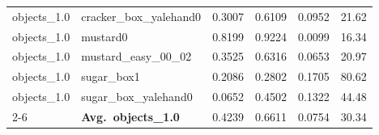 \begin{longtable}{llrrrr}
  objects_1.0 & cracker\_box\_yalehand0 & 0.3007 & 0.6109 & 0.0952 & 21.62 \\
  objects_1.0 & mustard0 & 0.8199 & 0.9224 & 0.0099 & 16.34 \\
  objects_1.0 & mustard\_easy\_00\_02 & 0.3525 & 0.6316 & 0.0653 & 20.97 \\
  objects_1.0 & sugar\_box1 & 0.2086 & 0.2802 & 0.1705 & 80.62 \\
  objects_1.0 & sugar\_box\_yalehand0 & 0.0652 & 0.4502 & 0.1322 & 44.48 \\
  \cmidrule{2-6}
  & \textbf{Avg.~objects_1.0} & 0.4239 & 0.6611 & 0.0754 & 30.34 \\
  \midrule
\bottomrule
\end{longtable}